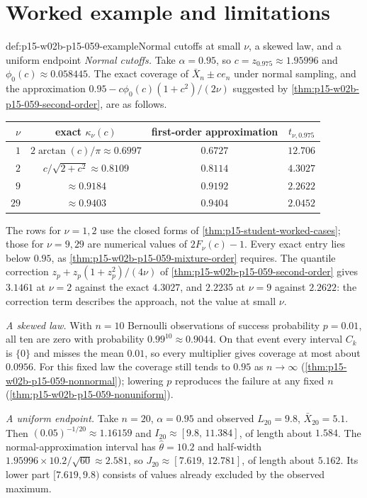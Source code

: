 \section{Worked example and limitations}
\label{sec:p15-w02b-p15-059-example}

\begin{hbexample}{def:p15-w02b-p15-059-example}{Normal cutoffs at small \(\nu\), a skewed law, and a uniform endpoint}
\emph{Normal cutoffs.} Take \(\alpha=0.95\), so
\(c=z_{0.975}\approx1.95996\) and \(\phi_0(c)\approx0.058445\). The exact
coverage of \(\bar X_n\pm ce_n\) under normal sampling, and the
approximation \(0.95-c\phi_0(c)(1+c^2)/(2\nu)\) suggested by
\cref{thm:p15-w02b-p15-059-second-order}, are as follows.
\begin{center}
\begin{tabular}{rccc}
\(\nu\) & exact \(\kappa_\nu(c)\) & first-order approximation & \(t_{\nu,0.975}\)\\
\hline
\(1\) & \(2\arctan(c)/\pi\approx0.6997\) & \(0.6727\) & \(12.706\)\\
\(2\) & \(c/\sqrt{2+c^2}\approx0.8109\) & \(0.8114\) & \(4.3027\)\\
\(9\) & \(\approx0.9184\) & \(0.9192\) & \(2.2622\)\\
\(29\) & \(\approx0.9403\) & \(0.9404\) & \(2.0452\)\\
\end{tabular}
\end{center}
The rows for \(\nu=1,2\) use the closed forms of
\cref{thm:p15-student-worked-cases}; those for \(\nu=9,29\) are numerical
values of \(2F_\nu(c)-1\). Every exact entry lies below \(0.95\), as
\cref{thm:p15-w02b-p15-059-mixture-order} requires. The quantile
correction \(z_p+z_p(1+z_p^2)/(4\nu)\) of
\cref{thm:p15-w02b-p15-059-second-order} gives \(3.1461\) at \(\nu=2\)
against the exact \(4.3027\), and \(2.2235\) at \(\nu=9\) against
\(2.2622\): the correction term describes the approach, not the value at
small \(\nu\).

\emph{A skewed law.} With \(n=10\) Bernoulli observations of success
probability \(p=0.01\), all ten are zero with probability
\(0.99^{10}\approx0.9044\). On that event every interval
\(C_k\) is \(\{0\}\) and misses the mean \(0.01\), so every multiplier
gives coverage at most about \(0.0956\). For this fixed law the coverage
still tends to \(0.95\) as \(n\to\infty\)
(\cref{thm:p15-w02b-p15-059-nonnormal}); lowering \(p\) reproduces the
failure at any fixed \(n\) (\cref{thm:p15-w02b-p15-059-nonuniform}).

\emph{A uniform endpoint.} Take \(n=20\), \(\alpha=0.95\) and observed
\(L_{20}=9.8\), \(\bar X_{20}=5.1\). Then
\((0.05)^{-1/20}\approx1.16159\) and \(I_{20}\approx[9.8,\,11.384]\), of
length about \(1.584\). The normal-approximation interval has
\(\widehat\theta=10.2\) and half-width
\(1.95996\times10.2/\sqrt{60}\approx2.581\), so
\(J_{20}\approx[7.619,\,12.781]\), of length about \(5.162\). Its lower
part \([7.619,9.8)\) consists of values already excluded by the observed
maximum.
\end{hbexample}

